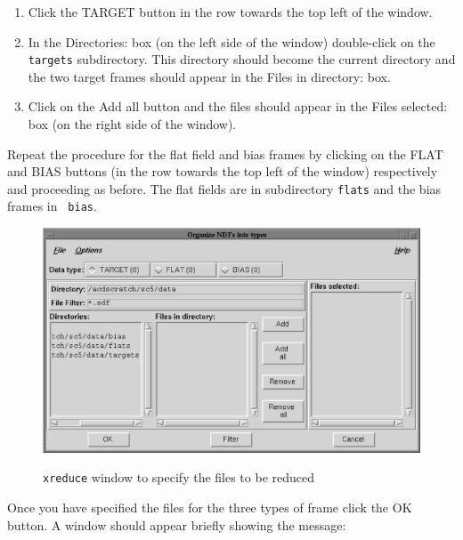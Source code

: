 \documentclass[twoside,11pt]{article}
\begin{document}
\begin{enumerate}
  \begin{enumerate}

    \item Click the {\sf TARGET} button in the row towards the top left
     of the window.

    \item In the {\sf Directories:} box (on the left side of the window)
     double-click on the {\tt targets} subdirectory.  This directory
     should become the current directory and the two target frames should
     appear in the {\sf Files in directory:} box.

    \item Click on the {\sf Add all} button and the files should appear
     in the {\sf Files selected:} box (on the right side of the window).

  \end{enumerate}

   Repeat the procedure for the flat field and bias frames by clicking
   on the {\sf FLAT} and {\sf BIAS} buttons (in the row towards the top
   left of the window) respectively and proceeding as before.  The flat
   fields are in subdirectory {\tt flats} and the bias frames in {\tt
   bias}.

  \begin{figure}[htbp]
     \centering
      \includegraphics[totalheight=3in]{sc5_organisendftypes.ps}
      \begin{quote}
      \caption{{\tt xreduce} window to specify the files to be reduced
      \label{ORGANISENDFTYPES} }
      \end{quote}
  \end{figure}

   Once you have specified the files for the three types of frame click
   the {\sf OK} button.  A window should appear briefly showing the message:


\end{enumerate}
\end{document}
